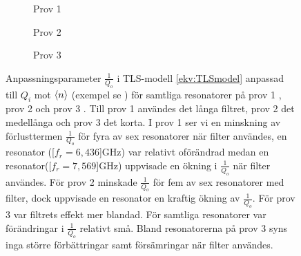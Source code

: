 \documentclass[main.tex]{subfiles}
\begin{document}
\begin{figure}[h]
    \begin{subfigure}{0.5\textwidth}
    \centering
    \setlength{}
    \setlength\figureheight{11em}
    
    \caption{Prov 1}
    \label{fig:Q_other_C}
    \end{subfigure}
    \begin{subfigure}{0.5\textwidth}
    \centering
    \setlength{}
    \setlength\figureheight{11em}
    
    \caption{Prov 2}
    \label{fig:Q_other_d}
    \end{subfigure}
    \begin{center}
    \begin{subfigure}{0.75\textwidth}
    \centering
    \setlength{}
    \setlength\figureheight{11em}
    
    \caption{Prov 3}
    \label{fig:Q_other_A}
    \end{subfigure}
    \end{center}
    \caption{Anpassningsparameter $\frac{1}{Q_o}$ i TLS-modell \eqref{ekv:TLSmodel} anpassad till $Q_i$ mot $\expval{n}$ (exempel se ) för samtliga resonatorer på prov 1 , prov 2  och prov 3 . Till prov 1 användes det långa filtret, prov 2 det medellånga och prov 3 det korta. I prov 1 ser vi en minskning av förlusttermen $\frac{1}{Q_o}$ för fyra av sex resonatorer när filter användes, en resonator (\unit[$f_r=6,436$]{GHz}) var relativt oförändrad medan en resonator(\unit[$f_r=7,569$]{GHz}) uppvisade en ökning i $\frac{1}{Q_o}$ när filter användes. För prov 2 minskade $\frac{1}{Q_o}$ för fem av sex resonatorer med filter, dock uppvisade en resonator en kraftig ökning av $\frac{1}{Q_o}$. För prov 3 var filtrets effekt mer blandad. För samtliga resonatorer var förändringar i $\frac{1}{Q_o}$ relativt små. Bland resonatorerna på prov 3 syns inga större förbättringar samt försämringar när filter användes.}
    \label{fig:my_label}
\end{figure}
\end{document}
